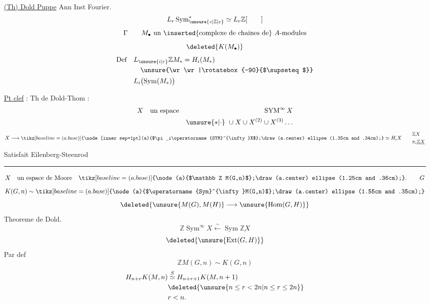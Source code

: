 \uline{(Th) Dold Puppe} Ann Inst Fourier.
\[
L_r\operatorname{Sym}_{\unsure{z|\mathbb Z|e}}^{*}\simeq L_r\mathbb Z[\qquad]
\]
\[
\Gamma\qquad M_{\bullet}\ \text{un \inserted{complexe de chaines de} $A$-modules}
\]
\[
\deleted{K(M_{\bullet})}
\]
\[
\begin{aligned}
\text{Def}\quad & L_{\unsure{i|r}}\mathbb Z M_{*}=H_i(M_{*})\\
&\quad\unsure{\wr\wr|\rotatebox{-90}{$\supseteq$}}\\
& L_i\bigl(\operatorname{Sym}(M_{*})\bigr)
\end{aligned}
\]

\uline{Pt clef} : Th de Dold-Thom :
\[
\begin{aligned}
X\quad&\text{un espace} &\operatorname{SYM}^{\infty}X\\
&&\unsure{*|\cdot}\ \cup X\cup X^{(2)}\cup X^{(3)}\ldots
\end{aligned}
\]
\[
X\longrightarrow
\tikz[baseline=(a.base)]{\node[inner sep=1pt](a){$\pi_i\operatorname{SYM}^{\infty}X$};\draw (a.center) ellipse (1.35cm and .34cm);}
\simeq H_i X
\qquad
\begin{aligned}&\mathbb Z X\\&\pi_i\underline{\mathbb Z X}\end{aligned}
\]
Satisfait   Eilenberg-Steenrod

\begin{center}\rule{1.7cm}{0.35pt}\end{center}
\[
X\quad\text{un espace de Moore}\quad
\tikz[baseline=(a.base)]{\node(a){$\mathbb Z M(G,n)$};\draw(a.center) ellipse (1.25cm and .36cm);}. \qquad G
\]
\[
K(G,n)\sim
\tikz[baseline=(a.base)]{\node(a){$\operatorname{Sym}^{\infty}M(G,n)$};\draw(a.center) ellipse (1.55cm and .35cm);}
\]
\[
\deleted{\unsure{M(G),M(H)}\longrightarrow\unsure{\operatorname{Hom}(G,H)}}
\]
Theoreme de Dold.
\[
\mathbb Z\operatorname{Sym}^{\infty}X\overset{\sim}{\longleftarrow}\operatorname{Sym}\underline{\mathbb Z X}
\]
\[
\deleted{\unsure{\operatorname{Ext}(G,H)}}
\]
 Par def
\[
\mathbb Z M(G,n)\sim K(G,n)
\]
\[
\begin{aligned}
H_{n+r}K(M,n)&\overset{S}{\simeq} H_{n+r+1}K(M,n+1)\\
&\deleted{\unsure{n\leq r<2n|n\leq r\leq 2n}}\\
&r<n .
\end{aligned}
\]

